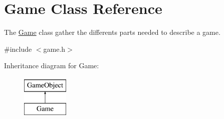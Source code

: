 \hypertarget{class_game}{\section{\-Game \-Class \-Reference}
\label{class_game}
}


\-The \hyperlink{class_game}{\-Game} class gather the differents parts needed to describe a game.  




{\ttfamily \#include $<$game.\-h$>$}

\-Inheritance diagram for \-Game\-:\begin{figure}[H]
\begin{center}
\leavevmode
\includegraphics[height=2.000000cm]{class_game}
\end{center}
\end{figure}
